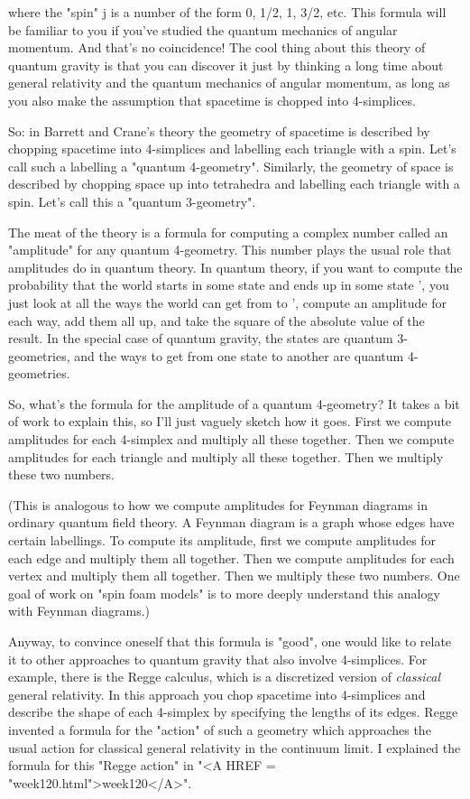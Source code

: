 where the "spin" j is a number of the form 0, 1/2, 1, 3/2, etc.   This
formula will be familiar to you if you've studied the quantum mechanics
of angular momentum.  And that's no coincidence!  The cool thing about
this theory of quantum gravity is that you can discover it just by 
thinking a long time about general relativity and the quantum mechanics 
of angular momentum, as long as you also make the assumption that
spacetime is chopped into 4-simplices.  

So: in Barrett and Crane's theory the geometry of spacetime is described
by chopping spacetime into 4-simplices and labelling each triangle with
a spin.  Let's call such a labelling a "quantum 4-geometry".  Similarly,
the geometry of space is described by chopping space up into tetrahedra
and labelling each triangle with a spin.  Let's call this a "quantum 
3-geometry".  

The meat of the theory is a formula for computing a complex number
called an "amplitude" for any quantum 4-geometry.  This number plays the
usual role that amplitudes do in quantum theory.  In quantum theory, if
you want to compute the probability that the world starts in some state
\psi  and ends up in some state \psi ', you just look at all the ways the
world can get from \psi  to \psi ', compute an amplitude for each way, add
them all up, and take the square of the absolute value of the result. 
In the special case of quantum gravity, the states are quantum 3-geometries, 
and the ways to get from one state to another are quantum 4-geometries. 

So, what's the formula for the amplitude of a quantum 4-geometry?  It
takes a bit of work to explain this, so I'll just vaguely sketch how it
goes.  First we compute amplitudes for each 4-simplex and multiply all
these together.  Then we compute amplitudes for each triangle and
multiply all these together.  Then we multiply these two numbers.

(This is analogous to how we compute amplitudes for Feynman diagrams
in ordinary quantum field theory.  A Feynman diagram is a graph whose
edges have certain labellings.  To compute its amplitude, first we 
compute amplitudes for each edge and multiply them all together.  Then 
we compute amplitudes for each vertex and multiply them all together.
Then we multiply these two numbers.  One goal of work on "spin 
foam models" is to more deeply understand this analogy with Feynman
diagrams.)

Anyway, to convince oneself that this formula is "good", 
one would like
to relate it to other approaches to quantum gravity that also involve
4-simplices.  For example, there is the Regge calculus, which is a
discretized version of \emph{classical} general relativity.  In this approach
you chop spacetime into 4-simplices and describe the shape of each
4-simplex by specifying the lengths of its edges.  Regge invented a
formula for the "action" of such a geometry which approaches the usual
action for classical general relativity in the continuum limit.  I 
explained the formula for this "Regge action" in "<A HREF = "week120.html">week120</A>".   

